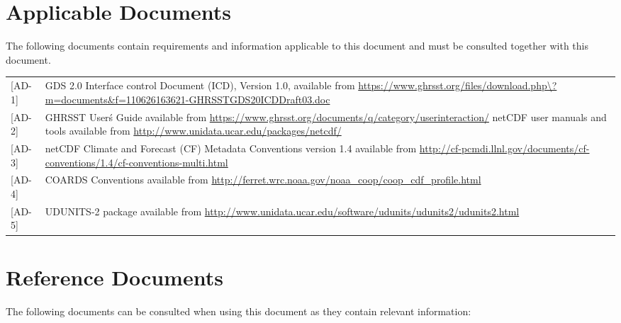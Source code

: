 \pagebreak
\section{Applicable Documents}
\par\vspace{0.5cm}
The following documents contain requirements and information applicable to this document and must
be consulted together with this document.
\par\vspace{0.5cm}

\begin{tabular}{ l p{13cm} }
    [AD-1] & GDS 2.0 Interface control Document (ICD), Version 1.0, available from \url{https://www.ghrsst.org/files/download.php\?m=documents\&f=110626163621-GHRSSTGDS20ICDDraft03.doc} \\

    [AD-2] & GHRSST User\'s Guide available from \url{https://www.ghrsst.org/documents/q/category/userinteraction/}
    netCDF user manuals and tools available from \url{http://www.unidata.ucar.edu/packages/netcdf/} \\

    [AD-3] & netCDF Climate and Forecast (CF) Metadata Conventions version 1.4 available from \url{http://cf-pcmdi.llnl.gov/documents/cf-conventions/1.4/cf-conventions-multi.html} \\

    [AD-4] & COARDS Conventions available from \url{http://ferret.wrc.noaa.gov/noaa\_coop/coop\_cdf\_profile.html} \\

    [AD-5] & UDUNITS-2 package available from \url{http://www.unidata.ucar.edu/software/udunits/udunits2/udunits2.html}\\
\end{tabular}
\section{Reference Documents}
\par\vspace{0.5cm}
The following documents can be consulted when using this document as they contain relevant information:
\par\vspace{0.5cm}

